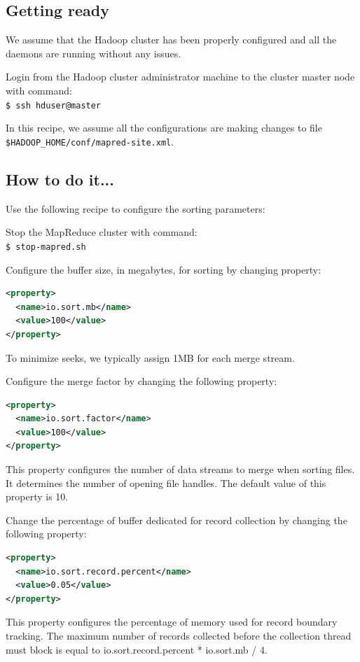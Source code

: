 \subsection*{Getting ready}
We assume that the Hadoop cluster has been properly configured and all the daemons are running without any issues.

Login from the Hadoop cluster administrator machine to the cluster master node with command: \\
\verb|$ ssh hduser@master|

In this recipe, we assume all the configurations are making changes to file \verb|$HADOOP_HOME/conf/mapred-site.xml|.
\subsection*{How to do it...}
Use the following recipe to configure the sorting parameters:

Stop the MapReduce cluster with command: \\
\verb|$ stop-mapred.sh|

Configure the buffer size, in megabytes, for sorting by changing property:
\lstset{style=bashstyle}
\begin{lstlisting}[language=XML]
<property>
  <name>io.sort.mb</name>
  <value>100</value>
</property>
\end{lstlisting}

To minimize seeks, we typically assign 1MB for each merge stream.

Configure the merge factor by changing the following property:
\lstset{style=bashstyle}
\begin{lstlisting}[language=XML]
<property>
  <name>io.sort.factor</name>
  <value>100</value>
</property>
\end{lstlisting}

This property configures the number of data streams to merge when sorting files. It determines the number of opening file handles. The default value of this property is 10.

Change the percentage of buffer dedicated for record collection by changing the following property:
\lstset{style=bashstyle}
\begin{lstlisting}[language=XML]
<property>
  <name>io.sort.record.percent</name>
  <value>0.05</value>
</property>
\end{lstlisting}
This property configures the percentage of memory used for record boundary tracking.  The maximum number of records collected before the collection thread must block is equal to io.sort.record.percent * io.sort.mb / 4.

